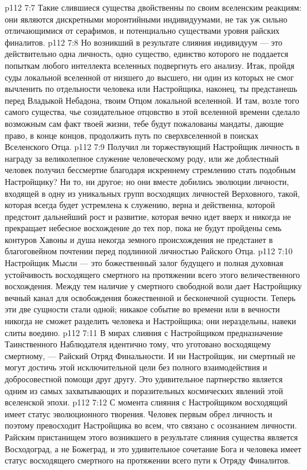 \vs p112 7:7 \pc Такие слившиеся существа двойственны по своим вселенским реакциям: они являются дискретными моронтийными индивидуумами, не так уж сильно отличающимися от серафимов, и потенциально существами уровня райских финалитов.
\vs p112 7:8 Но возникший в результате слияния индивидуум --- это действительно одна личность, одно существо, единство которого не поддается попыткам любого интеллекта вселенных подвергнуть его анализу. Итак, пройдя суды локальной вселенной от низшего до высшего, ни один из которых не смог вычленить по отдельности человека или Настройщика, наконец, ты предстанешь перед Владыкой Небадона, твоим Отцом локальной вселенной. И там, возле того самого существа, чье созидательное отцовство в этой вселенной времени сделало возможным сам факт твоей жизни, тебе будут пожалованы мандаты, дающие право, в конце концов, продолжить путь по сверхвселенной в поисках Вселенского Отца.
\vs p112 7:9 Получил ли торжествующий Настройщик личность в награду за великолепное служение человеческому роду, или же доблестный человек получил бессмертие благодаря искреннему стремлению стать подобным Настройщику? Ни то, ни другое; но они вместе добились эволюции личности, входящей в одну из уникальных групп восходящих личностей Верховного, такой, которая всегда будет устремлена к служению, верна и действенна, которой предстоит дальнейший рост и развитие, которая вечно идет вверх и никогда не прекращает небесное восхождение до тех пор, пока не будут пройдены семь контуров Хавоны и душа некогда земного происхождения не предстанет в благоговейном почтении перед подлинной личностью Райского Отца.
\vs p112 7:10 Настройщик Мысли --- это божественный залог будущего и полная духовная устойчивость восходящего смертного на протяжении всего этого величественного восхождения. Между тем наличие у смертного свободной воли дает Настройщику вечный канал для освобождения божественной и бесконечной сущности. Теперь эти две сущности стали одной; никакое событие во времени или в вечности никогда не сможет разделить человека и Настройщика; они нераздельны, навеки слиты воедино.
\vs p112 7:11 \pc В мирах слияния с Настройщиком предназначение Таинственного Наблюдателя идентично тому, что уготовано восходящему смертному, --- Райский Отряд Финальности. И ни Настройщик, ни смертный не могут достичь этой исключительной цели без полного взаимодействия и добросовестной помощи друг другу. Это удивительное партнерство является одним из самых захватывающих и поразительных космических явлений этой вселенской эпохи.
\vs p112 7:12 С момента слияния с Настройщиком восходящий имеет статус эволюционного творения. Человек первым обрел личность и поэтому превосходит Настройщика во всем, что связано с осознанием личности. Райским пристанищем этого возникшего в результате слияния существа является Восходоград, а не Божеград, и это удивительное сочетание Бога и человека имеет статус восходящего смертного на протяжении всего пути к Отряду Финалитов.
